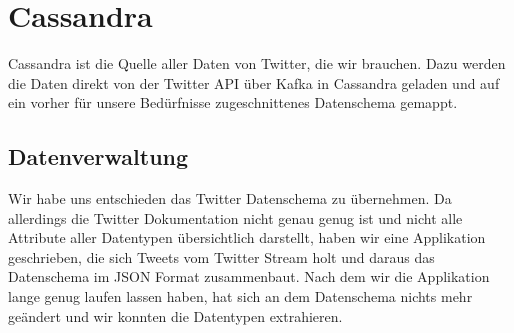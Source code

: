 \chapter{Cassandra}
\label{chap:cassandra}
Cassandra ist die Quelle aller Daten von Twitter, die wir brauchen. Dazu werden die Daten direkt von der Twitter API über Kafka in Cassandra geladen und auf ein vorher für unsere Bedürfnisse zugeschnittenes Datenschema gemappt.

\section{Datenverwaltung}
Wir habe uns entschieden das Twitter Datenschema zu übernehmen. Da allerdings die Twitter Dokumentation nicht genau genug ist und nicht alle Attribute aller Datentypen übersichtlich darstellt, haben wir eine Applikation geschrieben, die sich Tweets vom Twitter Stream holt und daraus das Datenschema im JSON Format zusammenbaut. Nach dem wir die Applikation lange genug laufen lassen haben, hat sich an dem Datenschema nichts mehr geändert und wir konnten die Datentypen extrahieren.\\

